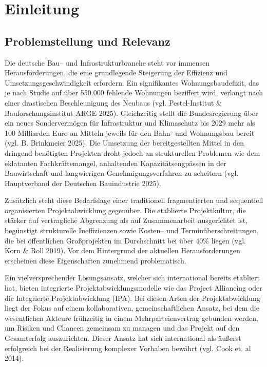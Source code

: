 \chapter{Einleitung}
\label{ch:einleitung}

\section{Problemstellung und Relevanz}
\label{sec:problemstellung}
Die deutsche Bau-- und Infrastrukturbranche steht vor immensen Herausforderungen, die  eine grundlegende Steigerung der Effizienz und Umsetzungsgeschwindigkeit erfordern.  Ein signifikantes Wohnungsbaudefizit, das je nach Studie auf über 550.000 fehlende  Wohnungen beziffert wird, verlangt nach einer drastischen Beschleunigung des Neubaus (vgl. Pestel-Institut \& Bauforschungsinstitut ARGE 2025). Gleichzeitig stellt die  Bundesregierung über ein neues Sondervermögen für Infrastruktur und Klimaschutz bis  2029 mehr als 100 Milliarden Euro an Mitteln jeweils für den Bahn- und Wohnungsbau  bereit (vgl. B. Brinkmeier 2025). Die Umsetzung der bereitgestellten Mittel in den dringend  benötigten Projekten droht jedoch an strukturellen Problemen wie dem eklatanten  Fachkräftemangel, anhaltenden Kapazitätsengpässen in der Bauwirtschaft und  langwierigen Genehmigungsverfahren zu scheitern (vgl. Hauptverband der Deutschen  Bauindustrie 2025).

Zusätzlich steht diese Bedarfslage einer traditionell fragmentierten und sequentiell  organisierten Projektabwicklung gegenüber. Die etablierte Projektkultur, die stärker auf  vertragliche Abgrenzung als auf Zusammenarbeit ausgerichtet ist, begünstigt strukturelle  Ineffizienzen sowie Kosten-- und Terminüberschreitungen, die bei öffentlichen  Großprojekten im Durchschnitt bei über 40\% liegen (vgl. Korn \& Roll 2019). Vor dem  Hintergrund der aktuellen Herausforderungen erscheinen diese Eigenschaften  zunehmend problematisch.

Ein vielversprechender Lösungsansatz, welcher sich international bereits etabliert hat,  bieten integrierte Projektabwicklungsmodelle wie das Project Alliancing oder die  Integrierte Projektabwicklung (IPA). Bei diesen Arten der Projektabwicklung liegt der  Fokus auf einem kollaborativen, gemeinschaftlichen Ansatz, bei dem die wesentlichen  Akteure frühzeitig in einem Mehrparteienvertrag gebunden werden, um Risiken und  Chancen gemeinsam zu managen und das Projekt auf den Gesamterfolg auszurichten.  Dieser Ansatz hat sich international als äußerst erfolgreich bei der Realisierung  komplexer Vorhaben bewährt (vgl. Cook et. al 2014).

